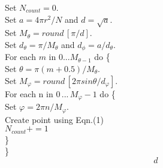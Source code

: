 \documentclass{article}
\begin{document}
	$ $\\
	Set $N_{count} = 0$. \\
	Set $a = 4\pi r^2/N$ and $d=\sqrt{a}$. \\
	Set $M_{\theta} = round \,[\pi/d]$. \\
	Set $d_{\theta} = \pi / M_{\theta}$ and $d_{\phi} = a/d_{\theta}$. \\
	For each $m$ in $0 ... M_{\theta-1}$ do \{ \\
	\hspace*{0.5cm} Set $\theta = \pi(m+0.5)/M_{\theta}.$\\
	\hspace*{0.5cm} Set $M_{\varphi} = round\, [2\pi sin\theta /d_{\varphi}].$ \\
	\hspace*{0.5cm} For each n in $0\,...\,M_{\varphi}-1$ do \{ \\
	\hspace*{1cm} Set $\varphi = 2\pi n/M_{\varphi}$. \\
	\hspace*{1cm} Create point using Eqn.(1) \\
	\hspace*{1cm} $N_{count} += 1$ \\
	\hspace*{0.5cm} \} \\
	\} \\
	\begin{equation}
	d
	\end{equation}
\end{document}
